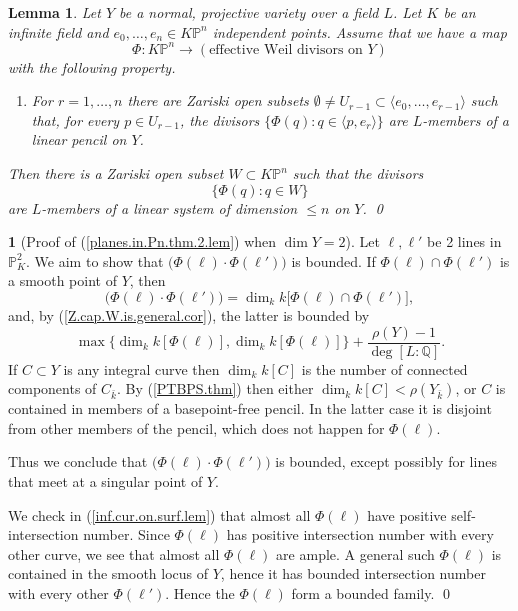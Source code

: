 \documentclass{amsart}
\newtheorem{lem}[thm]{Lemma}
\theoremstyle{definition}
\newtheorem{say}[thm]{}
\theoremstyle{remark}
\newcommand{\p}[0]{{\mathbb P}}
\newcommand{\q}[0]{{\mathbb Q}}
\begin{document}
\begin{lem}\label{build.linsys.lem} Let $Y$ be a normal, projective variety over a field $L$. Let $K$ be an infinite field and $e_0, \dots, e_n\in K\p^n$
independent points. Assume that we have a map
$$
\Phi: K\p^n\to (\mbox{effective Weil divisors on $Y$})
$$
with the following property. 
\begin{enumerate}
\item For $r=1,\dots, n$ there are Zariski open subsets $\emptyset\neq U_{r-1}\subset \langle e_0, \dots, e_{r-1}\rangle$ such that, for every $p\in U_{r-1}$, the divisors
$\{\Phi(q): q\in \langle p, e_{r}\rangle\}$
are $L$-members of a linear pencil on $Y$. 
\end{enumerate}
Then there is a Zariski open subset $W\subset  K\p^n$ such that 
the divisors
$$
\{\Phi(q): q\in W\}
$$
are $L$-members of a linear system of dimension $\leq n$  on $Y$. \qed
\end{lem}






\begin{say}[Proof of  (\ref{planes.in.Pn.thm.2.lem}) when $\dim Y= 2$]
\label{planes.in.Pn.thm.2.lem.pf.2}
Let $\ell,\ell'$ be 2 lines in $\p^2_K$. 
We aim to show that  $\bigl(\Phi(\ell)\cdot \Phi(\ell')\bigr)$ is bounded.
If $\Phi(\ell)\cap \Phi(\ell')$ is a smooth point of $Y$, then
$$
\bigl(\Phi(\ell)\cdot \Phi(\ell')\bigr)=\dim_kk\bigl[\Phi(\ell)\cap \Phi(\ell')\bigr],
$$
and, by (\ref{Z.cap.W.is.general.cor}), the latter is bounded by
$$
\max\bigl\{ \dim_kk[\Phi(\ell)],  \dim_kk[\Phi(\ell)]\bigr\}+\frac{\rho(Y)-1}{\deg [L:\q]}.
$$
If $C\subset Y$ is any integral curve then $\dim_k k[C]$ is
the number of connected components of $C_{\bar k}$. By (\ref{PTBPS.thm}) 
then either $\dim_k k[C]<\rho(Y_{\bar k})$, or $C$ 
is contained in members of a basepoint-free pencil. In the latter case it is disjoint from other members of the pencil, which does not happen for
$\Phi(\ell)$. 

Thus we conclude that 
$\bigl(\Phi(\ell)\cdot \Phi(\ell')\bigr)$ is bounded, except possibly for lines that meet at a singular point of $Y$.

We check in (\ref{inf.cur.on.surf.lem}) that almost all 
$\Phi(\ell)$ have positive self-intersection number.
Since  $\Phi(\ell)$ has positive intersection number with every other curve, 
we see that almost all $\Phi(\ell)$  are ample.
A general such $\Phi(\ell)$ is contained in the smooth locus of $Y$, hence it has bounded intersection number with every other $\Phi(\ell')$.
Hence the $\Phi(\ell)$ form a bounded family. 
\qed
\end{say}
\end{document}

